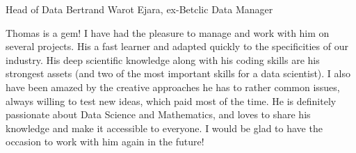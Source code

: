 \begin{cventries}
\cventry
    {Head of Data} %
    {Bertrand Warot} %
    {Ejara, ex-Betclic Data Manager} %
    {} %
    {
    \begin{cvitems}
    Thomas is a gem!
I have had the pleasure to manage and work with him on several projects.
His a fast learner and adapted quickly to the specificities of our industry. His deep scientific knowledge along with his coding skills are his strongest assets (and two of the most important skills for a data scientist). I also have been amazed by the creative approaches he has to rather common issues, always willing to test new ideas, which paid most of the time.
He is definitely passionate about Data Science and Mathematics, and loves to share his knowledge and make it accessible to everyone.
I would be glad to have the occasion to work with him again in the future!
    \end{cvitems}
    }



\end{cventries}
